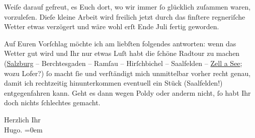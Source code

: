                Weiſe darauf gefreut, es Euch dort, wo wir immer{ }ſo glücklich zuſammen waren,
               vorzuleſen. Dieſe kleine Arbeit wird freilich jetzt {\pb}durch das finſtere regneriſche
               Wetter etwas verzögert und wäre wohl erſt Ende Juli fertig geworden.\pend
           
\pstart
           Auf Euren Vorſchlag möchte ich am liebſten folgendes antworten: wenn das Wetter gut
               wird und Ihr nur etwas Luſt habt die{ }ſchöne Radtour zu machen (\uline{Salzburg} – Berchtesgaden – Ramſau – Hirſchbichel –
                  Saalfelden – \uline{Zell a See}; wozu Lofer?){ }ſo macht{ }ſie und
               verſtändigt {\pb}mich unmittelbar
               vorher \introOben{}recht genau\introOben{}, damit ich rechtzeitig hinunterkommen
               eventuell ein Stück (Saalfelden!)
               entgegenfahren kann. Geht es dann wegen Poldy
               oder anderm nicht,{ }ſo habt Ihr doch nichts{ }ſchlechtes gemacht.\pend
           
\pstart
           Herzlich Ihr{\\[\baselineskip]}\spacefill\mbox{Hugo.}\pend
           \leftskip=0em{}\endnumbering{}  \newcommand{\dateiname}{L00703}\newcommand{\titel}{Hugo von Hofmannsthal an Arthur Schnitzler, 16. [7. 1897]}\newcommand{\editorInnen}{Martin Anton Müller und Gerd-Hermann Susen}
